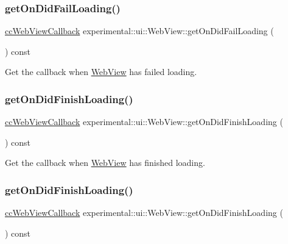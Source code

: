 \subsubsection{\texorpdfstring{get\+On\+Did\+Fail\+Loading()}{getOnDidFailLoading()}\hspace{0.1cm}{\footnotesize\ttfamily [2/2]}}
{\footnotesize\ttfamily \hyperlink{classexperimental_1_1ui_1_1WebView_a11ddd376a5996eff614857f236b2b69d}{cc\+Web\+View\+Callback} experimental\+::ui\+::\+Web\+View\+::get\+On\+Did\+Fail\+Loading (\begin{DoxyParamCaption}{ }\end{DoxyParamCaption}) const}

Get the callback when \hyperlink{classexperimental_1_1ui_1_1WebView}{Web\+View} has failed loading. \mbox{\label{classexperimental_1_1ui_1_1WebView_a2bebc9f5a5744de9e6e9a80d57bc6fde}} 
\subsubsection{\texorpdfstring{get\+On\+Did\+Finish\+Loading()}{getOnDidFinishLoading()}\hspace{0.1cm}{\footnotesize\ttfamily [1/2]}}
{\footnotesize\ttfamily \hyperlink{classexperimental_1_1ui_1_1WebView_a11ddd376a5996eff614857f236b2b69d}{cc\+Web\+View\+Callback} experimental\+::ui\+::\+Web\+View\+::get\+On\+Did\+Finish\+Loading (\begin{DoxyParamCaption}{ }\end{DoxyParamCaption}) const}

Get the callback when \hyperlink{classexperimental_1_1ui_1_1WebView}{Web\+View} has finished loading. \mbox{\label{classexperimental_1_1ui_1_1WebView_a2bebc9f5a5744de9e6e9a80d57bc6fde}} 
\subsubsection{\texorpdfstring{get\+On\+Did\+Finish\+Loading()}{getOnDidFinishLoading()}\hspace{0.1cm}{\footnotesize\ttfamily [2/2]}}
{\footnotesize\ttfamily \hyperlink{classexperimental_1_1ui_1_1WebView_a11ddd376a5996eff614857f236b2b69d}{cc\+Web\+View\+Callback} experimental\+::ui\+::\+Web\+View\+::get\+On\+Did\+Finish\+Loading (\begin{DoxyParamCaption}{ }\end{DoxyParamCaption}) const}

